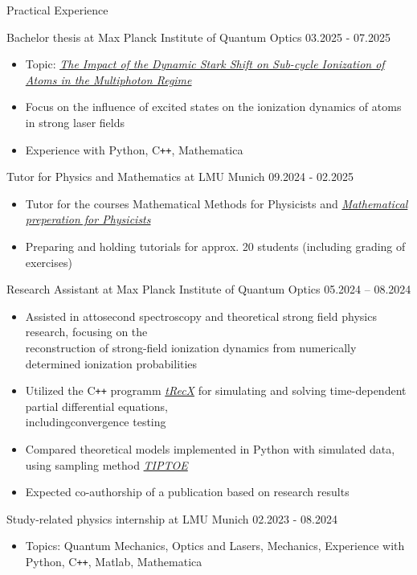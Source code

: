 \documentclass{resume}
\begin{document}
\begin{rSection}{Practical Experience}

    Bachelor thesis at Max Planck Institute of Quantum Optics \hfill 03.2025 - 07.2025
    \begin{itemize}\footnotesize
        \item Topic: \textit{\href{https://doi.org/10.5281/zenodo.16223179}{The Impact of the Dynamic Stark Shift on Sub-cycle Ionization of Atoms in the Multiphoton Regime}}
        \item Focus on the influence of excited states on the ionization dynamics of atoms in strong laser fields
        \item Experience with Python, C\texttt{++}, Mathematica
    \end{itemize}

    Tutor for Physics and Mathematics at LMU Munich \hfill 09.2024 - 02.2025
    \begin{itemize}\footnotesize
        \item Tutor for the courses Mathematical Methods for Physicists and \textit{\href{https://www.physik.lmu.de/de/studium/zusatzangebote/mathe-crashkurs/}{Mathematical preperation for Physicists}}
        \item Preparing and holding tutorials for approx. 20 students (including grading of exercises)
    \end{itemize}

    Research Assistant at Max Planck Institute of Quantum Optics \hfill 05.2024 – 08.2024
    \begin{itemize}\footnotesize
        \item Assisted in attosecond spectroscopy and theoretical strong field physics research, focusing on the\\reconstruction of strong-field ionization dynamics from numerically determined ionization probabilities
        \item Utilized the C\texttt{++} programm \textit{\href{https://gitlab.physik.uni-muenchen.de/AG-Scrinzi/tRecX}{tRecX}} for simulating and solving time-dependent partial differential equations,\\includingconvergence testing
        \item Compared theoretical models implemented in Python with simulated data, using sampling method \textit{\href{https://doi.org/10.1364/OPTICA.5.000402}{TIPTOE}}
        \item Expected co-authorship of a publication based on research results
    \end{itemize}

    Study-related physics internship at LMU Munich \hfill 02.2023 - 08.2024
    \begin{itemize}\footnotesize
        \item Topics: Quantum Mechanics, Optics and Lasers, Mechanics, Experience with Python, C\texttt{++}, Matlab, Mathematica
    \end{itemize}

\end{rSection}
\end{document}
